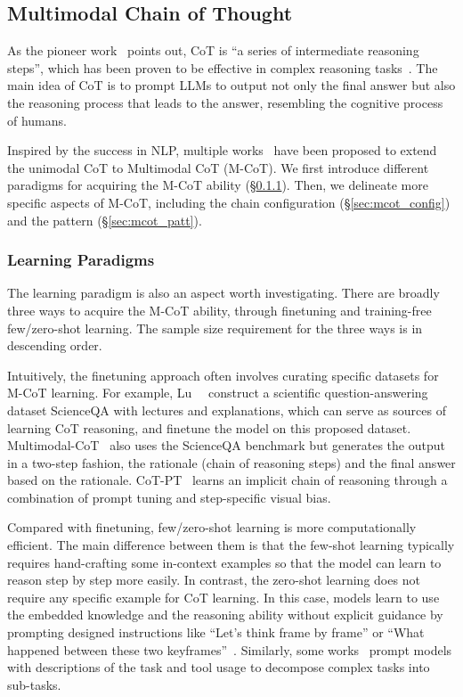 \subsection{Multimodal Chain of Thought}
\label{sec:mcot}

As the pioneer work~\cite{wei2022chain} points out, CoT is ``a series of intermediate reasoning steps'', which has been proven to be effective in complex reasoning tasks~\cite{wei2022chain, kojima2022large, zhang2022automatic}.
The main idea of CoT is to prompt LLMs to output not only the final answer but also the reasoning process that leads to the answer, resembling the cognitive process of humans.

Inspired by the success in NLP, multiple works~\cite{vcot, multimodal-cot, vip, cot-prompt-tuning} have been proposed to extend the unimodal CoT to Multimodal CoT (M-CoT). 
We first introduce different paradigms for acquiring the M-CoT ability (\S \ref{sec:mcot_learn}). 
Then, we delineate more specific aspects of M-CoT, including the chain configuration (\S \ref{sec:mcot_config}) and the pattern (\S \ref{sec:mcot_patt}).



\subsubsection{Learning Paradigms}
\label{sec:mcot_learn}
The learning paradigm is also an aspect worth investigating. 
There are broadly three ways to acquire the M-CoT ability, \ie through finetuning and training-free few/zero-shot learning. 
The sample size requirement for the three ways is in descending order. 

Intuitively, the finetuning approach often involves curating specific datasets for M-CoT learning. 
For example, Lu~\etal~\cite{scienceqa} construct a scientific question-answering dataset ScienceQA with lectures and explanations, which can serve as sources of learning CoT reasoning, and finetune the model on this proposed dataset. 
Multimodal-CoT~\cite{multimodal-cot} also uses the ScienceQA benchmark but generates the output in a two-step fashion, \ie the rationale (chain of reasoning steps) and the final answer based on the rationale. 
CoT-PT~\cite{cot-prompt-tuning} learns an implicit chain of reasoning through a combination of prompt tuning and step-specific visual bias.

Compared with finetuning, few/zero-shot learning is more computationally efficient. The main difference between them is that the few-shot learning typically requires hand-crafting some in-context examples so that the model can learn to reason step by step more easily. 
In contrast, the zero-shot learning does not require any specific example for CoT learning. In this case, models learn to use the embedded knowledge and the reasoning ability without explicit guidance by prompting designed instructions like ``Let's think frame by frame'' or ``What happened between these two keyframes''~\cite{vcot, vip}. 
Similarly, some works~\cite{mm-react, visual-chatgpt} prompt models with descriptions of the task and tool usage to decompose complex tasks into sub-tasks.

